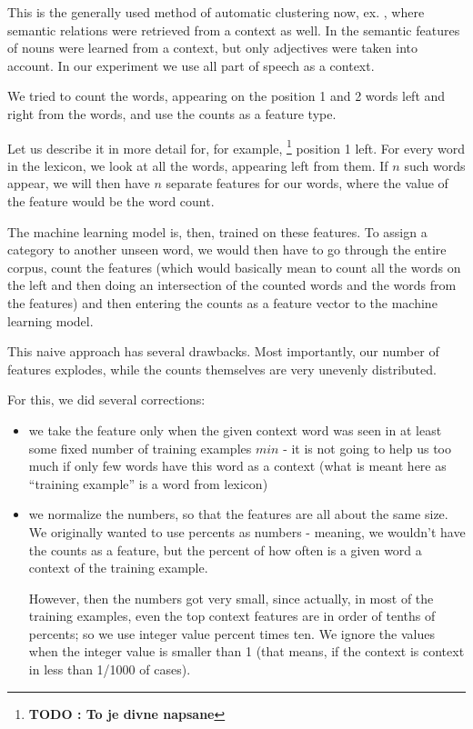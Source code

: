 \documentclass[letterpaper]{article}
\newcommand{\todofn}[1] {
 \footnote{\textbf{TODO : #1}}}
\begin{document}
This is  the generally used method of automatic clustering now, ex. \cite{baroni:2009},
where semantic relations were retrieved from a context as well. 
In \cite{biemann05} the semantic features of nouns were learned
from a context, but only adjectives were taken into account.
In our experiment we use all part of speech as a context. 

We tried to count the words, appearing on the position 1 and 2 words left and 
right from the words, and use the counts as a feature type. 

Let us describe it in more detail for, for example, \todofn{To je divne napsane} position 1 left. For every word in the lexicon, we 
look at all the words, appearing left from them. If $n$ such words appear, we will then have $n$ separate 
features for our words, where the value of the feature would be the word count.
 
The machine learning model is, then, trained on these features. To assign a category
to another unseen word, we would then have to go through the entire corpus, count
the features (which would basically mean to count all the words on the left and then doing an 
intersection of the counted words and the words from the features) and then entering the 
counts as a feature vector to the machine learning model.

This naive approach has several drawbacks. Most importantly, our number of features explodes, while the counts themselves are very unevenly distributed.

For this, we did several corrections:
\begin{itemize}
    \item we take the feature only when the given context word was seen in at least some 
fixed number of training examples $min$ - it is not going to help us too much 
if only few words have this word as a context (what is meant here 
as ``training example'' is a word from lexicon)
    
    \item we normalize the numbers, so that the features are all about 
the same size. We originally wanted to use percents as numbers - meaning, 
we wouldn't have the counts as a feature, but the percent of how often is a given word a context of the training example.
    
     However, then the numbers got very small, since actually, 
in most of the training examples, even the top context features are in order of 
tenths of percents; so we use integer value percent times ten. 
We ignore the values when the integer value is smaller than 1 (that means, if the context is context in less than 1/1000 of cases).
     

\end{itemize}
\end{document}
